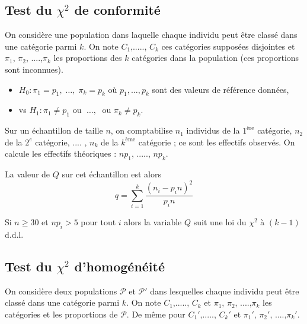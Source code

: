 \documentclass[12pt, a4paper]{article}
\begin{document}
\subsection[Test du chi-2 de conformité]{Test du $\chi^2$ de conformité}
On considère une population dans laquelle chaque individu peut être classé dans une catégorie parmi $k$. 
On note $C_1$,....., $C_k$ ces catégories supposées disjointes et $\pi_1$, $\pi_2$, ....,$\pi_k$ les proportions des $k$ catégories dans la population (ces proportions sont inconnues). \\

\begin{itemize}
\item[] $H_0 : \pi_1=p_1, \;\hdots,\; \pi_k=p_k$ où $p_1, \hdots, p_k$ sont
des valeurs de référence données,
\item[] vs $H_1 : \pi_1\neq p_1 \mbox{ ou } \;\hdots,\;  \mbox{ ou } \pi_k \neq p_k$. \\
\end{itemize}

%

Sur un échantillon de taille $n$, on comptabilise $n_1$ individus de la $1^{\text{ère}}$ catégorie, 
$n_2$ de la $2^e$ catégorie, .... , $n_k$ de la $k^{\text{ème}}$ catégorie ; ce sont les effectifs observés. On calcule les effectifs théoriques : $np_1$, ....., $np_k$.

La valeur de $Q$ sur cet échantillon est alors 
$$
q=\sum_{i=1}^k \frac{(n_i- p_i n)^2}{p_i n}
$$

Si $n\geq 30$ et $np_i > 5$ pour tout $i$ alors la variable $Q$ suit une loi du $\chi^2$ à $(k-1)$ d.d.l.

\subsection[Test du chi-2 d'homogénéité]{Test du $\chi^2$ d'homogénéité}

On considère deux populations $\mathcal{P}$ et $\mathcal{P}'$ dans lesquelles chaque individu peut être classé dans une catégorie parmi $k$. 
On note $C_1$,....., $C_k$ et $\pi_1$, $\pi_2$, ....,$\pi_k$ les catégories et les proportions de $\mathcal{P}$. De même pour  $C_1'$,....., $C_k'$ et $\pi_1'$, $\pi_2'$, ....,$\pi_k'$.\\
\end{document}
